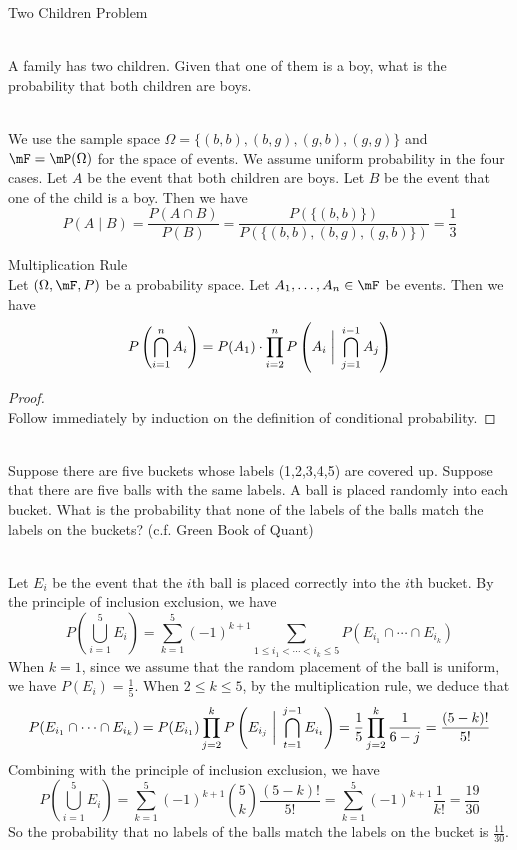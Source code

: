 \documentclass[a4paper]{article}
\begin{document}
\begin{eg}{Two Children Problem}{}\\
\end{eg}

\begin{eg}{}{}\\
A family has two children. Given that one of them is a boy, what is the probability that both children are boys. 
\begin{answer}\\
We use the sample space $\Omega=\{(b,b),(b,g),(g,b),(g,g)\}$ and $\mF=\mP(\Omega)$ for the space of events. We assume uniform probability in the four cases. Let $A$ be the event that both children are boys. Let $B$ be the event that one of the child is a boy. Then we have $$P(A\;|\;B)=\frac{P(A\cap B)}{P(B)}=\frac{P(\{(b,b)\})}{P(\{(b,b),(b,g),(g,b)\})}=\frac{1}{3}$$
\end{answer}
\end{eg}

\begin{prp}{Multiplication Rule}{}\\
Let $(\Omega,\mF,P)$ be a probability space. Let $A_1,\dots,A_n\in\mF$ be events. Then we have 
$$P\left(\bigcap_{i=1}^nA_i\right)=P(A_1)\cdot\prod_{i=2}^nP\left(A_i\;\bigg{|}\;\bigcap_{j=1}^{i-1}A_j\right)$$
\begin{proof}\\
Follow immediately by induction on the definition of conditional probability. 
\end{proof}
\end{prp}

\begin{eg}{}{}\\
Suppose there are five buckets whose labels (1,2,3,4,5) are covered up. Suppose that there are five balls with the same labels. A ball is placed randomly into each bucket. What is the probability that none of the labels of the balls match the labels on the buckets? (c.f. Green Book of Quant)
\begin{answer}\\
Let $E_i$ be the event that the $i$th ball is placed correctly into the $i$th bucket. By the principle of inclusion exclusion, we have $$P\left(\bigcup_{i=1}^5E_i\right)=\sum_{k=1}^5(-1)^{k+1}\sum_{1\leq i_1<\cdots<i_k\leq 5}P(E_{i_1}\cap\cdots\cap E_{i_k})$$ When $k=1$, since we assume that the random placement of the ball is uniform, we have $P(E_i)=\frac{1}{5}$. When $2\leq k\leq 5$, by the multiplication rule, we deduce that $$P(E_{i_1}\cap\cdots\cap E_{i_k})=P(E_{i_1})\prod_{j=2}^kP\left(E_{i_j}\;\bigg{|}\;\bigcap_{t=1}^{j-1}E_{i_t}\right)=\frac{1}{5}\prod_{j=2}^k\frac{1}{6-j}=\frac{(5-k)!}{5!}$$ Combining with the principle of inclusion exclusion, we have $$P\left(\bigcup_{i=1}^5E_i\right)=\sum_{k=1}^5(-1)^{k+1}\binom{5}{k}\frac{(5-k)!}{5!}=\sum_{k=1}^5(-1)^{k+1}\frac{1}{k!}=\frac{19}{30}$$ So the probability that no labels of the balls match the labels on the bucket is $\frac{11}{30}$. 
\end{answer}
\end{eg}
\end{document}
